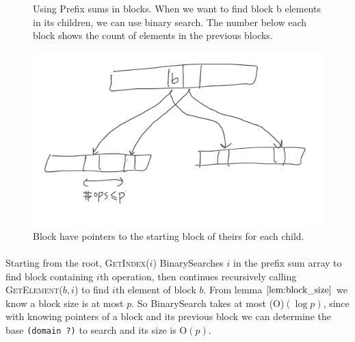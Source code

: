 \documentclass[10pt]{article}
\theoremstyle{definition}
\begin{document}
\begin{figure}
\begin{center}
\end{center}
\caption{\label{fig:prefix} Using Prefix sums in blocks. When we want to find block b elements in its children, we can use binary search. The number below each block shows the count of elements in the previous blocks.}
\end{figure}

\begin{figure}[hbt]
\centering
  \includegraphics[width=5in]{pics/pointers}
  \caption{Block have pointers to the starting block of theirs for each child. \label{fig::pointer}}
\end{figure}


\paragraph{}
Starting from the root, \textsc{GetIndex}($i$) BinarySearches $i$ in the prefix sum array to find block containing $i$th operation, then continues recursively calling \textsc{GetElement}($b,i$) to find $i$th element of block $b$. From lemma $\ref{lem:block_size}$ we know a block size is at most $p$. So BinarySearch takes at most \textsc(O)$(\log p)$, since  with knowing pointers of a block and its previous block we can determine the base \texttt{(domain ?)} to search and its size is \textsc{O}$(p)$.
\end{document}
